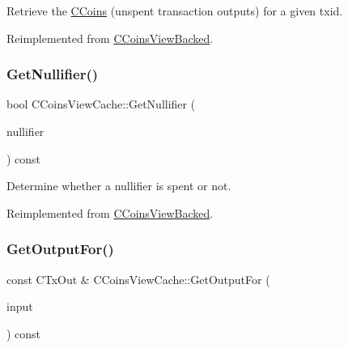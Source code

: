 Retrieve the \mbox{\hyperlink{class_c_coins}{C\+Coins}} (unspent transaction outputs) for a given txid. 



Reimplemented from \mbox{\hyperlink{class_c_coins_view_backed_a456f9e85817556329a959c120998df5b}{C\+Coins\+View\+Backed}}.

\mbox{\label{class_c_coins_view_cache_a72dd0d15434f85d518f23a278e813a03}} 
\subsubsection{\texorpdfstring{Get\+Nullifier()}{GetNullifier()}}
{\footnotesize\ttfamily bool C\+Coins\+View\+Cache\+::\+Get\+Nullifier (\begin{DoxyParamCaption}\item[{const \mbox{\hyperlink{classuint256}{uint256}} \&}]{nullifier }\end{DoxyParamCaption}) const\hspace{0.3cm}{\ttfamily [virtual]}}



Determine whether a nullifier is spent or not. 



Reimplemented from \mbox{\hyperlink{class_c_coins_view_backed_afbfee79b18b475d67cd757a7dc4f5955}{C\+Coins\+View\+Backed}}.

\mbox{\label{class_c_coins_view_cache_a54a0de51586fa92d83cfa321fb8936c5}} 
\subsubsection{\texorpdfstring{Get\+Output\+For()}{GetOutputFor()}}
{\footnotesize\ttfamily const C\+Tx\+Out \& C\+Coins\+View\+Cache\+::\+Get\+Output\+For (\begin{DoxyParamCaption}\item[{const C\+Tx\+In \&}]{input }\end{DoxyParamCaption}) const}

\mbox{\label{class_c_coins_view_cache_a111d5a94709eaccd57bafe6ab1d938af}} 
